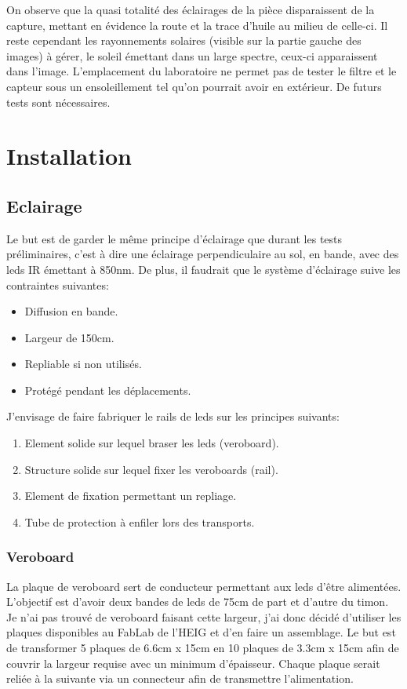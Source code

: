 On observe que la quasi totalité des éclairages de la pièce disparaissent de la capture,
mettant en évidence la route et la trace d'huile au milieu de celle-ci. Il reste cependant les rayonnements solaires (visible sur la partie gauche des images)
à gérer, le soleil émettant dans un large spectre, ceux-ci apparaissent dans l'image. L'emplacement du laboratoire ne permet pas de
tester le filtre et le capteur sous un ensoleillement tel qu'on pourrait avoir en extérieur. De futurs tests sont nécessaires.

\section{Installation}
\subsection{Eclairage}
Le but est de garder le même principe d'éclairage que durant les tests préliminaires, c'est à dire une éclairage perpendiculaire au sol,
en bande, avec des leds IR émettant à 850nm. De plus, il faudrait que le système d'éclairage suive les contraintes suivantes:
\begin{itemize}
    \item Diffusion en bande.
    \item Largeur de 150cm.
    \item Repliable si non utilisés.
    \item Protégé pendant les déplacements.
\end{itemize}
J'envisage de faire fabriquer le rails de leds sur les principes suivants:
\begin{enumerate}
    \item Element solide sur lequel braser les leds (veroboard).
    \item Structure solide sur lequel fixer les veroboards (rail).
    \item Element de fixation permettant un repliage.
    \item Tube de protection à enfiler lors des transports.
\end{enumerate}
\subsubsection{Veroboard}
La plaque de veroboard sert de conducteur permettant aux leds d'être alimentées. L'objectif est d'avoir deux bandes de leds de 75cm de part et d'autre
du timon. Je n'ai pas trouvé de veroboard faisant cette largeur, j'ai donc décidé d'utiliser les plaques disponibles au FabLab de l'HEIG et d'en faire un assemblage.
Le but est de transformer 5 plaques de 6.6cm x 15cm en 10 plaques de 3.3cm x 15cm afin de couvrir la largeur requise avec un minimum d'épaisseur.
Chaque plaque serait reliée à la suivante via un connecteur afin de transmettre l'alimentation.

